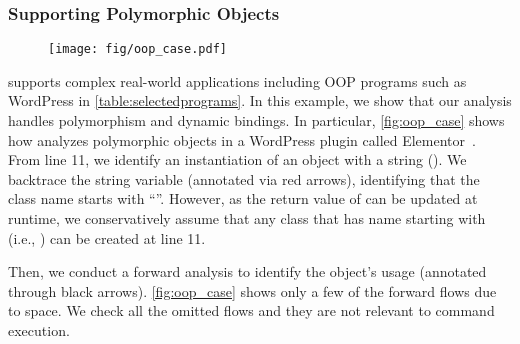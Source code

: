 




\subsubsection{Supporting Polymorphic Objects}


\begin{figure}[!h]
    \centering
    \vspace{1em}
    \texttt{[image: fig/oop\_case.pdf]}
    \vspace{-2em}
    \caption{}
    \vspace{-1em}
    \label{fig:oop_case}
\end{figure}


%
\sysname supports complex real-world applications including OOP programs such as WordPress in \autoref{table:selectedprograms}.
In this example, we show that our analysis handles polymorphism and dynamic bindings. 
In particular, \autoref{fig:oop_case} shows how \sysname analyzes polymorphic objects in a WordPress plugin called Elementor~\cite{ElementorWebsiteBuilder}.
%
From line 11, we identify an instantiation of an object with a string (). We backtrace the string variable (annotated via red arrows), identifying that the class name starts with ``''. However, as the return value of  can be updated at runtime, we conservatively assume that any class that has name starting with  (i.e., ) can be created at line 11.

Then, we conduct a forward analysis to identify the object's usage (annotated through black arrows). \autoref{fig:oop_case} shows only a few of the forward flows due to space. 
We check all the omitted flows and they are not relevant to command execution. %



